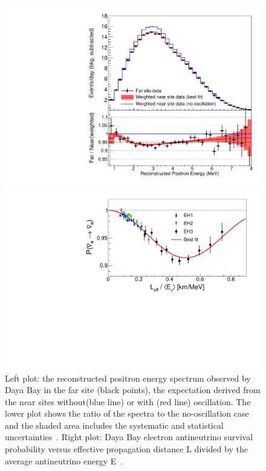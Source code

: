 \begin{figure}[htbp]
\begin{minipage}[c]{.46\linewidth}
   	      \includegraphics[width=0.9\linewidth]{figures/spectral_distortion_NL2015_v2.pdf}
   \end{minipage} \hfill
   \begin{minipage}{.46\linewidth}
      \includegraphics[width=0.9\linewidth]{figures/loe_NL2015.pdf}
   \end{minipage}
    \caption{Left plot: the reconstructed positron
energy spectrum observed by Daya Bay in the far site (black points), 
the expectation derived from the near sites without(blue line) or
with (red line) oscillation. The lower plot shows the ratio of the spectra to the no-oscillation case and the shaded area 
includes the systematic and statistical uncertainties~\cite{An:2015rpe}. 
Right plot: Daya Bay electron antineutrino survival probability versus effective
propagation distance L divided by the average antineutrino energy
E~\cite{An:2015rpe}.
}
 \label{fig:dayabay}
\end{figure}




